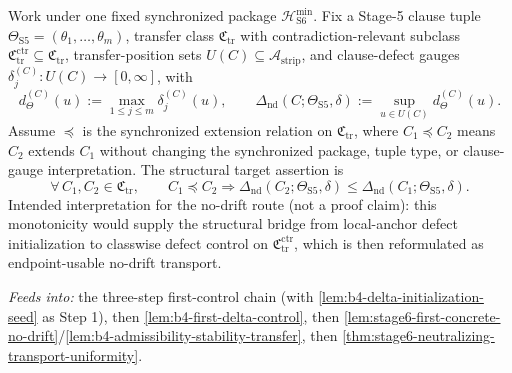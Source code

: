 \begin{lemma}
\label{lem:b4-delta-structural-nonincrease}
Work under one fixed synchronized package $\mathcal{H}_{\mathrm{S6}}^{\min}$.
Fix a Stage-5 clause tuple $\Theta_{\mathrm{S5}}=(\theta_1,\dots,\theta_m)$, transfer class $\mathfrak{C}_{\mathrm{tr}}$ with contradiction-relevant subclass $\mathfrak{C}_{\mathrm{tr}}^{\mathrm{ctr}}\subseteq\mathfrak{C}_{\mathrm{tr}}$, transfer-position sets $U(C)\subseteq\mathcal{A}_{\mathrm{strip}}$, and clause-defect gauges $\delta_j^{(C)}:U(C)\to[0,\infty]$, with
\[
d_{\Theta}^{(C)}(u):=\max_{1\le j\le m}\delta_j^{(C)}(u),\qquad
\Delta_{\mathrm{nd}}(C;\Theta_{\mathrm{S5}},\delta):=\sup_{u\in U(C)}d_{\Theta}^{(C)}(u).
\]
Assume $\preceq$ is the synchronized extension relation on $\mathfrak{C}_{\mathrm{tr}}$, where $C_1\preceq C_2$ means $C_2$ extends $C_1$ without changing the synchronized package, tuple type, or clause-gauge interpretation.
The structural target assertion is
\[
\forall\,C_1,C_2\in\mathfrak{C}_{\mathrm{tr}},\qquad
C_1\preceq C_2\Longrightarrow
\Delta_{\mathrm{nd}}(C_2;\Theta_{\mathrm{S5}},\delta)\le
\Delta_{\mathrm{nd}}(C_1;\Theta_{\mathrm{S5}},\delta).
\]
Intended interpretation for the no-drift route (not a proof claim): this monotonicity would supply the structural bridge from local-anchor defect initialization to classwise defect control on $\mathfrak{C}_{\mathrm{tr}}^{\mathrm{ctr}}$, which is then reformulated as endpoint-usable no-drift transport.
\end{lemma}
\noindent\emph{Feeds into:} the three-step first-control chain (with \cref{lem:b4-delta-initialization-seed} as Step 1), then \cref{lem:b4-first-delta-control}, then \cref{lem:stage6-first-concrete-no-drift}/\cref{lem:b4-admissibility-stability-transfer}, then \cref{thm:stage6-neutralizing-transport-uniformity}.

